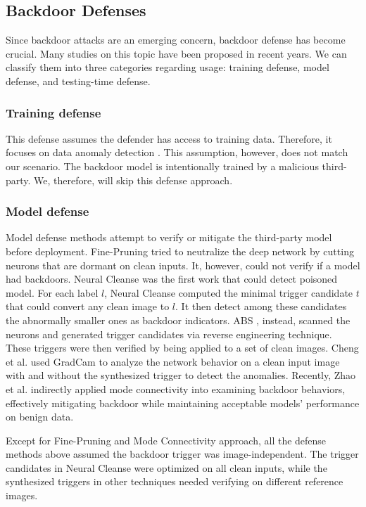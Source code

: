 \subsection{Backdoor Defenses}
Since backdoor attacks are an emerging concern, backdoor defense has become crucial. Many studies on this topic have been proposed in recent years. We can classify them into three categories regarding usage: training defense, model defense, and testing-time defense.

\subsubsection{Training defense} This defense assumes the defender has access to training data. Therefore, it focuses on data anomaly detection \cite{tran2018spectral}. This assumption, however, does not match our scenario. The backdoor model is intentionally trained by a malicious third-party. We, therefore, will skip this defense approach.

\subsubsection{Model defense} Model defense methods attempt to verify or mitigate the third-party model before deployment. 
Fine-Pruning \cite{liu2018fine} tried to neutralize the deep network by cutting neurons that are dormant on clean inputs. It, however, could not verify if a model had backdoors. 
Neural Cleanse \cite{wang2019neural} was the first work that could detect poisoned model. For each label $l$, Neural Cleanse computed the minimal trigger candidate $t$ that could convert any clean image to $l$. It then detect among these candidates the abnormally smaller ones as backdoor indicators. ABS \cite{liu2019abs}, instead, scanned the neurons and generated trigger candidates via reverse engineering technique. These triggers were then verified by being applied to a set of clean images. Cheng et al. \cite{Cheng2019} used GradCam \cite{selvaraju2017grad} to analyze the network behavior on a clean input image with and without the synthesized trigger to detect the anomalies. Recently, Zhao et al. \cite{zhao2020bridging} indirectly applied mode connectivity into examining backdoor behaviors, effectively mitigating backdoor while maintaining acceptable models' performance on benign data.

Except for Fine-Pruning and Mode Connectivity approach, all the defense methods above assumed the backdoor trigger was image-independent. The trigger candidates in Neural Cleanse were optimized on all clean inputs, while the synthesized triggers in other techniques needed verifying on different reference images.

